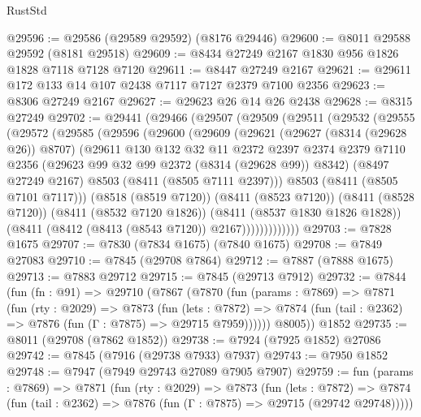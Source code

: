 \begin{lexlean}{RustStd}
\begin{coremodule}
@29596 := @29586 (@29589 @29592) (@8176 @29446)
@29600 := @8011 @29588 @29592 (@8181 @29518)
@29609 := @8434 @27249 @2167 @1830 @956 @1826 @1828 @7118 @7128 @7120
@29611 := @8447 @27249 @2167
@29621 := @29611 @172 @133 @14 @107 @2438 @7117 @7127 @2379 @7100 @2356
@29623 := @8306 @27249 @2167
@29627 := @29623 @26 @14 @26 @2438
@29628 := @8315 @27249
@29702 := @29441
    (@29466
      (@29507
        (@29509
          (@29511
            (@29532
              (@29555
                (@29572
                  (@29585
                    (@29596
                      (@29600
                        (@29609
                          (@29621
                            (@29627 (@8314 (@29628 @26)) @8707)
                            (@29611
                              @130
                              @132
                              @32
                              @11
                              @2372
                              @2397
                              @2374
                              @2379
                              @7110
                              @2356
                              (@29623 @99 @32 @99 @2372 (@8314 (@29628 @99)) @8342)
                              (@8497 @27249 @2167)
                              @8503
                              (@8411 (@8505 @7111 @2397)))
                            @8503
                            (@8411 (@8505 @7101 @7117)))
                          (@8518 (@8519 @7120))
                          (@8411 (@8523 @7120))
                          (@8411 (@8528 @7120))
                          (@8411 (@8532 @7120 @1826))
                          (@8411 (@8537 @1830 @1826 @1828))
                          (@8411 (@8412 (@8413 (@8543 @7120)) @2167)))))))))))))
@29703 := @7828 @1675
@29707 := @7830 (@7834 @1675) (@7840 @1675)
@29708 := @7849 @27083
@29710 := @7845 (@29708 @7864)
@29712 := @7887 (@7888 @1675)
@29713 := @7883 @29712
@29715 := @7845 (@29713 @7912)
@29732 := @7844
    (fun (fn : @91) =>
    @29710
      (@7867
        (@7870
          (fun (params : @7869) =>
          @7871
            (fun (rty : @2029) =>
            @7873
              (fun (lets : @7872) =>
              @7874 (fun (tail : @2362) => @7876 (fun (Γ : @7875) => @29715 @7959))))))
        @8005))
    @1852
@29735 := @8011 (@29708 (@7862 @1852))
@29738 := @7924 (@7925 @1852) @27086
@29742 := @7845 (@7916 (@29738 @7933) @7937)
@29743 := @7950 @1852
@29748 := @7947 (@7949 @29743 @27089 @7905 @7907)
@29759 := fun (params : @7869) =>
  @7871
    (fun (rty : @2029) =>
    @7873
      (fun (lets : @7872) =>
      @7874 (fun (tail : @2362) => @7876 (fun (Γ : @7875) => @29715 (@29742 @29748)))))

\end{coremodule}
\end{lexlean}
